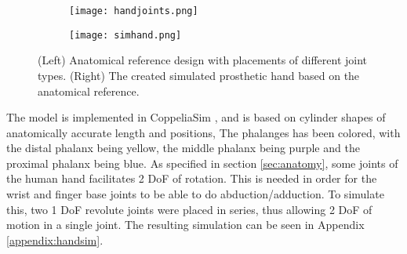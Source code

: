 \documentclass[../main.tex]{subfiles}
\begin{document}
\begin{figure}[H]
    \centering
    \begin{subfigure}[b]{0.49\textwidth}
        \centering
        \texttt{[image: handjoints.png]}
    \end{subfigure}
    \hfill
    \centering
    \begin{subfigure}[b]{0.49\textwidth}
        \centering
        \texttt{[image: simhand.png]}
    \end{subfigure}
    \caption{(Left) Anatomical reference design with placements of different joint types. (Right) The  created simulated prosthetic hand based on the anatomical reference.}
    \label{fig:simdesignandimpl}
\end{figure}

The model is implemented in CoppeliaSim \cite{coppeliasim}, and is based on cylinder shapes of anatomically accurate length and positions,
The phalanges has been colored, with the distal phalanx being yellow, the middle phalanx being purple and the proximal phalanx being blue.
As specified in section \ref{sec:anatomy}, some joints of the human hand facilitates 2 DoF of rotation.
This is needed in order for the wrist and finger base joints to be able to do \gls{abduction/adduction}.
To simulate this, two 1 DoF revolute joints were placed in series, thus allowing 2 DoF of motion in a single joint.
The resulting simulation can be seen in Appendix \ref{appendix:handsim}.

\end{document}
